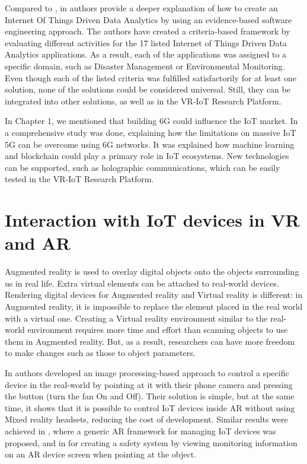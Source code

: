 Compared to \cite{k_mohapatra_solution_2016}, in \cite{ahmad_software_2021} authors provide a deeper explanation of how to create an Internet Of Things Driven Data Analytics by using an evidence-based software engineering approach. The authors have created a criteria-based framework by evaluating different activities for the 17 listed Internet of Things Driven Data Analytics applications. As a result, each of the applications was assigned to a specific domain, such as Disaster Management or Environmental Monitoring. Even though each of the listed criteria was fulfilled satisfactorily for at least one solution, none of the solutions could be considered universal. Still, they can be integrated into other solutions, as well as in the VR-IoT Research Platform.

In Chapter 1, we mentioned that building 6G could influence the IoT market. In \cite{guo_enabling_2021} a comprehensive study was done, explaining how the limitations on massive IoT 5G can be overcome using 6G networks. It was explained how machine learning and blockchain could play a primary role in IoT ecosystems. New technologies can be supported, such as holographic communications, which can be easily tested in the VR-IoT Research Platform.

\section{Interaction with IoT devices in VR and AR}

Augmented reality is used to overlay digital objects onto the objects surrounding us in real life. Extra virtual elements can be attached to real-world devices. Rendering digital devices for Augmented reality and Virtual reality is different: in Augmented reality, it is impossible to replace the element placed in the real world with a virtual one. Creating a Virtual reality environment similar to the real-world environment requires more time and effort than scanning objects to use them in Augmented reality. But, as a result, researchers can have more freedom to make changes such as those to object parameters. 

In \cite{ankireddy_augmented_2019} authors developed an image processing-based approach to control a specific device in the real-world by pointing at it with their phone camera and pressing the button (turn the fan On and Off). Their solution is simple, but at the same time, it shows that it is possible to control IoT devices inside AR without using Mixed reality headsets, reducing the cost of development. Similar results were achieved in \cite{jo_-situ_2016}, where a generic AR framework for managing IoT devices was proposed, and in \cite{alam_augmented_2017} for creating a safety system by viewing monitoring information on an AR device screen when pointing at the object.

